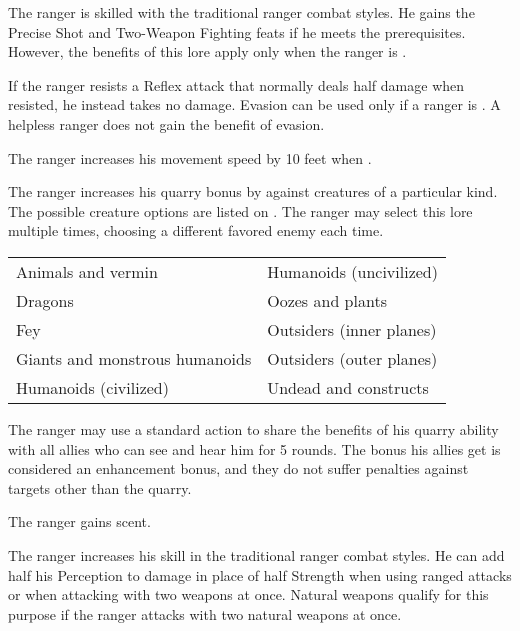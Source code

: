 The ranger is skilled with the traditional ranger combat styles.
He gains the Precise Shot and Two-Weapon Fighting feats if he meets the prerequisites.
However, the benefits of this lore apply only when the ranger is \unencumbered.

If the ranger resists a Reflex attack that normally deals half damage when resisted, he instead takes no damage.
Evasion can be used only if a ranger is \unencumbered.
A helpless ranger does not gain the benefit of evasion.

The ranger increases his movement speed by 10 feet when \unencumbered.

The ranger increases his quarry bonus by  against creatures of a particular kind.
The possible creature options are listed on .
The ranger may select this lore multiple times, choosing a different favored enemy each time.

\begin{dtable}
    \begin{tabularx}{\columnwidth}{X X}
        Animals and vermin & Humanoids (uncivilized) \\
        Dragons & Oozes and plants \\
        Fey & Outsiders (inner planes) \\
        Giants and monstrous humanoids & Outsiders (outer planes) \\
        Humanoids (civilized)  & Undead and constructs \\
    \end{tabularx}
\end{dtable}

The ranger may use a standard action to share the benefits of his quarry ability with all allies who can see and hear him for 5 rounds.
The bonus his allies get is considered an enhancement bonus, and they do not suffer penalties against targets other than the quarry.

The ranger gains scent.


The ranger increases his skill in the traditional ranger combat styles.
He can add half his Perception to damage in place of half Strength when using ranged attacks or when attacking with two weapons at once.
Natural weapons qualify for this purpose if the ranger attacks with two natural weapons at once.

